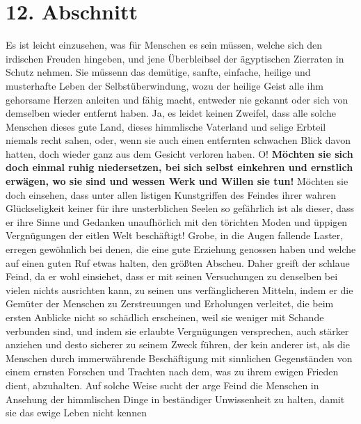 \section{12. Abschnitt} \label{kap17_ab12}

Es ist leicht einzusehen, was für Menschen es sein müssen, welche sich den
irdischen Freuden hingeben, und jene Überbleibsel der ägyptischen Zierraten in
Schutz nehmen. Sie müssenn das demütige, sanfte, einfache, heilige und
musterhafte Leben der Selbstüberwindung,
wozu der heilige Geist alle ihm gehorsame Herzen anleiten und fähig
macht, entweder nie gekannt oder sich von demselben wieder entfernt haben. Ja,
es leidet keinen Zweifel, dass alle solche Menschen dieses gute Land, dieses
himmlische Vaterland und selige Erbteil niemals recht sahen, oder, wenn sie auch
einen entfernten schwachen Blick davon hatten, doch wieder ganz aus dem Gesicht
verloren haben. O! \label{ref:17_12_einkehr}\textbf{Möchten sie sich doch einmal
ruhig niedersetzen, bei sich
selbst
einkehren und ernstlich erwägen, wo sie sind und wessen Werk und Willen sie
tun!} Möchten sie doch einsehen, dass unter allen listigen Kunstgriffen des
Feindes ihrer wahren Glückseligkeit keiner für ihre unsterblichen Seelen so
gefährlich ist als dieser, dass er ihre Sinne und Gedanken unaufhörlich mit den
törichten Moden und üppigen Vergnügungen der eitlen Welt beschäftigt! Grobe, in
die Augen fallende Laster, erregen gewöhnlich bei denen, die eine gute Erziehung
genossen haben und welche auf einen guten Ruf etwas halten, den größten
Abscheu. Daher greift der schlaue Feind, da er wohl einsiehet, dass er mit
seinen
Versuchungen zu denselben bei vielen nichts ausrichten kann, zu seinen uns
verfänglicheren Mitteln, indem er die Gemüter der Menschen zu Zerstreuungen und
Erholungen verleitet, die beim ersten Anblicke nicht so schädlich erscheinen,
weil sie weniger mit Schande verbunden sind, und indem sie erlaubte Vergnügungen
versprechen, auch stärker anziehen und desto sicherer zu seinem Zweck führen,
der kein anderer ist, als die Menschen durch immerwährende Beschäftigung mit
sinnlichen Gegenständen von einem ernsten Forschen und Trachten nach dem, was zu
ihrem ewigen Frieden dient, abzuhalten.
Auf solche
Weise sucht der arge Feind die Menschen in Ansehung der himmlischen Dinge in
beständiger Unwissenheit zu halten, damit sie das ewige Leben nicht kennen
